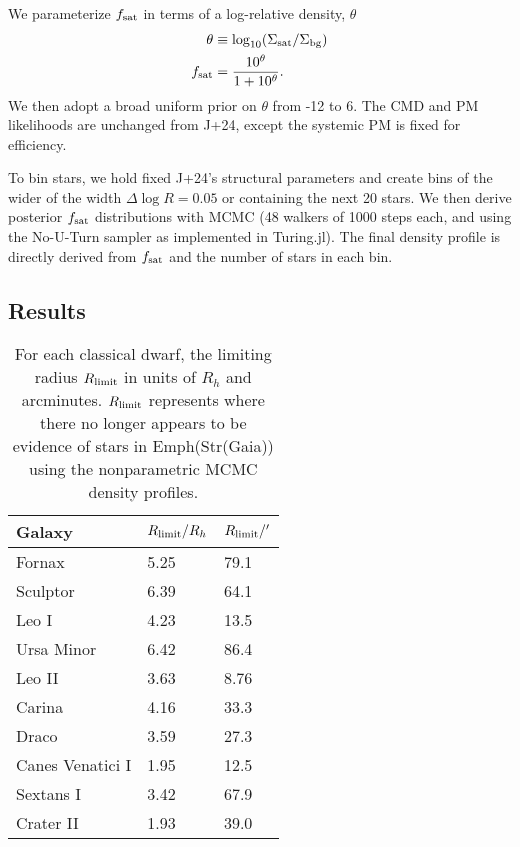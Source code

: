 We parameterize \(f_{\rm sat}\) in terms of a log-relative density,
\(\theta\) \begin{equation}{
\begin{split}
\theta &\equiv \log_{10}({\Sigma_{\rm sat}}/{\Sigma_{\rm bg}}) \\
f_{\rm sat} &= \frac{10^{\theta}}{1 + 10^{\theta}}.
\end{split}
}\end{equation} We then adopt a broad uniform prior on \(\theta\) from
-12 to 6. The CMD and PM likelihoods are unchanged from J+24, except the
systemic PM is fixed for efficiency.

To bin stars, we hold fixed J+24's structural parameters and create bins
of the wider of the width \(\Delta \log R=0.05\) or containing the next
20 stars. We then derive posterior \(f_{\rm sat}\) distributions with
MCMC (48 walkers of 1000 steps each, and using the No-U-Turn sampler as
implemented in Turing.jl). The final density profile is directly derived
from \(f_{\rm sat}\) and the number of stars in each bin.

\subsection{Results}\label{results}

\begin{table*}[t]
\centering
\caption[The limiting radii of Gaia-derived density profiles]{For each classical dwarf, the limiting radius $R_{\rm limit}$ in units of $R_h$ and arcminutes. $R_{\rm limit}$ represents where there no longer appears to be evidence of stars in Emph(Str(Gaia)) using the nonparametric MCMC density profiles. }
\label{tbl:mcmc_props}
\begin{tabular}{lll}
\toprule
Galaxy & $R_{\rm limit} / R_h$ & $R_{\rm limit} / '$\\
\midrule
Fornax & 5.25 & 79.1\\
Sculptor & 6.39 & 64.1\\
Leo I & 4.23 & 13.5\\
Ursa Minor & 6.42 & 86.4\\
Leo II & 3.63 & 8.76\\
Carina & 4.16 & 33.3\\
Draco & 3.59 & 27.3\\
Canes Venatici I & 1.95 & 12.5\\
Sextans I & 3.42 & 67.9\\
Crater II & 1.93 & 39.0\\
\bottomrule
\end{tabular}
\end{table*}

